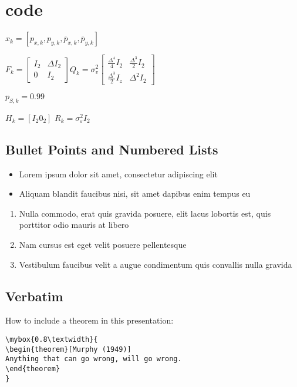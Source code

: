\documentclass[
paper=128mm:96mm, %
fontsize=11pt, %
pagesize, %
parskip=half-, %
]{scrartcl} %
\theoremstyle{mythmstyle} %
\newtheorem{theorem}{Theorem}[section] %
\newcommand*{\mybox}[2]{ %
\par\noindent
\begin{tikzpicture}[mynodestyle/.style={rectangle,draw=mygreen,thick,inner sep=2mm,text justified,top color=white,bottom color=white,above}]\node[mynodestyle,at={(0.5*#1+2mm+0.4pt,0)}]{ %
\begin{minipage}[t]{#1}
#2
\end{minipage}
};
\end{tikzpicture}
\par\vspace{-1.3em}}
\begin{document}
\clearpage
\section{code}
$x_k=[p_{x,k},p_{y,k},\overline{p}_{x,k},\overline{p}_{y,k}]$


$F_k=
\begin{bmatrix}
I_2 &  \Delta I_2 \\
0 & I_2
\end{bmatrix}
Q_k=\sigma_v^2\begin{bmatrix}
\frac{\Delta^4}{4} I_2 &  \frac{\Delta^3}{2} I_2 \\
\frac{\Delta^3}{2} I_z & {\Delta^2}I_2
\end{bmatrix}$

$p_{S,k}=0.99$

$H_k=[I_2 0_2]$
$R_k=\sigma_{\varepsilon}^{2}I_2$
\clearpage
\subsection{Bullet Points and Numbered Lists}

\begin{itemize}
\item Lorem ipsum dolor sit amet, consectetur adipiscing elit
\item Aliquam blandit faucibus nisi, sit amet dapibus enim tempus eu
\end{itemize}

\begin{enumerate}
\item Nulla commodo, erat quis gravida posuere, elit lacus lobortis est, quis porttitor odio mauris at libero
\item Nam cursus est eget velit posuere pellentesque
\item Vestibulum faucibus velit a augue condimentum quis convallis nulla gravida
\end{enumerate}

\clearpage


\subsection{Verbatim}

How to include a theorem in this presentation:
\begin{verbatim}
\mybox{0.8\textwidth}{
\begin{theorem}[Murphy (1949)]
Anything that can go wrong, will go wrong.
\end{theorem}
}
\end{verbatim}
\end{document}
